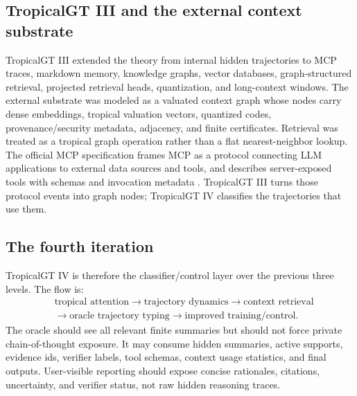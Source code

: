 \documentclass[11pt]{article}
\theoremstyle{definition}
\theoremstyle{remark}
\numberwithin{equation}{section}
\begin{document}
\subsection{TropicalGT III and the external context substrate}
TropicalGT III extended the theory from internal hidden trajectories to MCP traces, markdown memory, knowledge graphs, vector databases, graph-structured retrieval, projected retrieval heads, quantization, and long-context windows.  The external substrate was modeled as a valuated context graph whose nodes carry dense embeddings, tropical valuation vectors, quantized codes, provenance/security metadata, adjacency, and finite certificates.  Retrieval was treated as a tropical graph operation rather than a flat nearest-neighbor lookup.  The official MCP specification frames MCP as a protocol connecting LLM applications to external data sources and tools, and describes server-exposed tools with schemas and invocation metadata \cite{mcp2025spec,mcp2025tools}.  TropicalGT III turns those protocol events into graph nodes; TropicalGT IV classifies the trajectories that use them.

\subsection{The fourth iteration}
TropicalGT IV is therefore the classifier/control layer over the previous three levels.  The flow is:
\begin{equation}
\begin{aligned}
&\text{tropical attention}\rightarrow\text{trajectory dynamics}\rightarrow\text{context retrieval}\\
&\rightarrow\text{oracle trajectory typing}\rightarrow\text{improved training/control}.
\end{aligned}
\end{equation}
The oracle should see all relevant finite summaries but should not force private chain-of-thought exposure.  It may consume hidden summaries, active supports, evidence ids, verifier labels, tool schemas, context usage statistics, and final outputs.  User-visible reporting should expose concise rationales, citations, uncertainty, and verifier status, not raw hidden reasoning traces.
\end{document}
